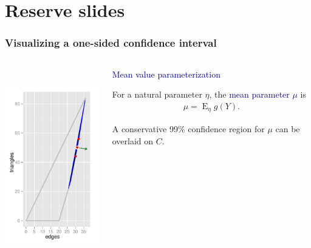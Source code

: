 \documentclass[ 10pt]{beamer}
\DeclareMathOperator{\E}{E}
\begin{document}
\section{Reserve slides}

\frame
{
\frametitle{Visualizing a one-sided confidence interval}  
\begin{columns}[]
\begin{column}[T]{0.36\textwidth}
\includegraphics[height=3.3in,  trim=0.1in 0in 0.2in 0in, clip=True]{CI99-muspace} %
\end{column}

\begin{column}[t]{0.64\textwidth}

\textcolor{darkblue}{Mean value parameterization}

For a natural parameter $\eta$, the \textcolor{darkblue}{mean parameter $\mu$} is
\begin{align*}
	\mu = \E_\eta g(Y).
\end{align*}

\vspace{2mm}

A conservative 99\% confidence region for $\mu$ 
can be overlaid on $C$.
\end{column}

\end{columns}
}
\end{document}
